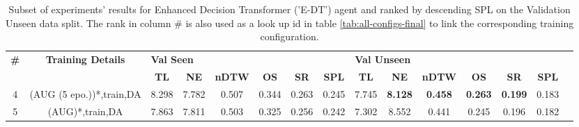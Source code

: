 \begin{table}
\centering
\caption{\label{tab:e_dt_dagger_envdrop}Subset of experiments' results for Enhanced Decision Transformer ('E-DT') agent and ranked by descending SPL on the Validation Unseen data split. The rank in column \# is also used as a look up id in table \ref{tab:all-configs-final} to link the corresponding training configuration.}
\begin{tabular}{@{\hskip3pt}c@{\hskip3pt}c@{\hskip3pt}c@{\hskip3pt}c@{\hskip3pt}c@{\hskip3pt}c@{\hskip3pt}c@{\hskip3pt}c@{\hskip3pt}c@{\hskip3pt}c@{\hskip3pt}c@{\hskip3pt}c@{\hskip3pt}c@{\hskip3pt}c@{\hskip3pt}c}
\toprule
\textbf{\#} & \textbf{Training Details} & \multicolumn{6}{l}{\textbf{Val Seen}} & \multicolumn{6}{l}{\textbf{Val Unseen}} \\
 \textbf{~} &                \textbf{~} &       \textbf{TL} & \textbf{NE} & \textbf{nDTW} & \textbf{OS} & \textbf{SR} & \textbf{SPL} &         \textbf{TL} &     \textbf{NE} &   \textbf{nDTW} &     \textbf{OS} &     \textbf{SR} & \textbf{SPL} \\
\midrule
          4 &  (AUG (5 epo.))*,train,DA &             8.298 &       7.782 &         0.507 &       0.344 &       0.263 &        0.245 &               7.745 &  \textbf{8.128} &  \textbf{0.458} &  \textbf{0.263} &  \textbf{0.199} &        0.183 \\
          5 &           (AUG)*,train,DA &             7.863 &       7.811 &         0.503 &       0.325 &       0.256 &        0.242 &               7.302 &           8.552 &           0.441 &           0.245 &           0.196 &        0.182 \\
\bottomrule
\end{tabular}
\end{table}
